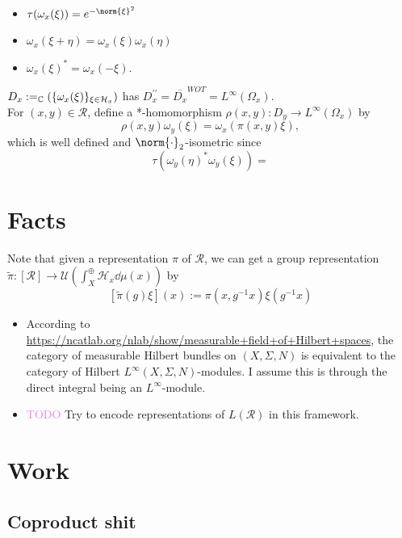 \documentclass[12pt,letterpaper]{article}
\newcommand{\lr}[1]{\left(#1\right)}
\newcommand{\C}{\mathbb{C}}
\renewcommand{\H}{\mathcal{H}}
\let\Span\relax
\DeclareMathOperator{\Span}{Span}
\newcommand*\cls[1]{\overline{#1}}
\theoremstyle{definition}
\theoremstyle{plain}
\theoremstyle{remark}
\begin{document}
\begin{itemize}
    \item $ \tau(\omega_{x}(\xi)) = e^{-\norm{\xi}^{2}} $ 
    \item $ \omega_{x}(\xi+\eta) = \omega_{x}(\xi) \omega_{x}(\eta) $
    \item $ \omega_{x}(\xi)^{*} = \omega_{x}(-\xi) $.
\end{itemize}

$ D_{x}:=\Span_{\C}(\{\omega_{x}(\xi)\}_{\xi\in\H_{x}}) $ has $ D_{x}^{\prime\prime} = \cls{D_{x}}^{WOT} = L^{\infty}(\Omega_{x}) $.\\

For $ (x,y)\in \mathcal{R} $, define a *-homomorphism $ \rho(x,y):D_{y}\to L^{\infty}(\Omega_{x}) $ by 
\[
    \rho(x,y) \omega_{y}(\xi) = \omega_{x}(\pi(x,y) \xi),
\]
which is well defined and $ \norm{\cdot}_{2} $-isometric since 
\[
    \tau(\omega_{y}(\eta)^{*} \omega_{y}(\xi)) = 
\]




\section{Facts}

Note that given a representation $ \pi $ of $ \mathcal{R} $, we can get a group representation $ \widetilde{\pi}:[\mathcal{R}]\to \mathcal{U}\lr{\int_{X}^{\oplus}\H_{x}\dd{\mu(x)}} $ by 
\[
    [\widetilde{\pi}(g) \xi](x) := \pi(x,g^{-1}x) \xi(g^{-1}x)
\]

\begin{itemize}
    \item According to \url{https://ncatlab.org/nlab/show/measurable+field+of+Hilbert+spaces}, the category of measurable Hilbert bundles on $ (X,\Sigma, N) $ is equivalent to the category of Hilbert $ L^{\infty}(X,\Sigma, N) $-modules. I assume this is through the direct integral being an $ L^\infty $-module.
    \item \textcolor{violet}{TODO} Try to encode representations of $ L(\mathcal{R}) $ in this framework.
\end{itemize}

\section{Work}
\subsection{Coproduct shit}
\end{document}
